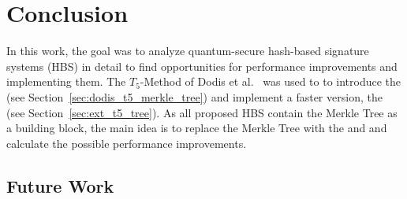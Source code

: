 \chapter{Conclusion}
\label{cha:conclusion}

In this work, the goal was to analyze quantum-secure hash-based signature systems (HBS) in detail to find opportunities for performance improvements and implementing them. 
The $T_5$-Method of Dodis et al.~\cite{T5_paper} was used to to introduce the \tftree (see Section~\ref{sec:dodis_t5_merkle_tree}) and implement a faster version, the \extree (see Section~\ref{sec:ext_t5_tree}).
As all proposed HBS contain the Merkle Tree as a building block, the main idea is to replace the Merkle Tree with the \tftree and \extree and calculate the possible performance improvements.





\section{Future Work}




